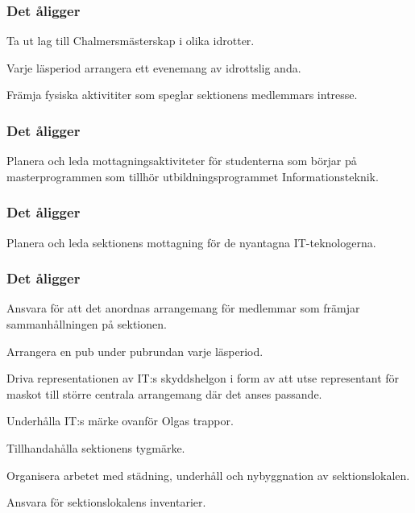 \subsubsection{Det åligger \FRITID}
\begin{att}
	\item Ta ut lag till Chalmersmästerskap i olika idrotter.
	\item Varje läsperiod arrangera ett evenemang av idrottslig anda.
	\item Främja fysiska aktivititer som speglar sektionens medlemmars intresse.
\end{att}

\subsubsection{Det åligger \MRCIT}
\begin{att}
  \item Planera och leda mottagningsaktiviteter för studenterna som börjar på masterprogrammen som tillhör utbildningsprogrammet Informationsteknik.
\end{att}

\subsubsection{Det åligger \NOLLKIT}
\begin{att}
	\item Planera och leda sektionens mottagning för de nyantagna IT-teknologerna.
\end{att}

\subsubsection{Det åligger \PRIT}
\begin{att}
	\item Ansvara för att det anordnas arrangemang för medlemmar som främjar sammanhållningen på sektionen.
	\item Arrangera en pub under pubrundan varje läsperiod.
	\item Driva representationen av IT:s skyddshelgon i form av att utse representant för maskot till större centrala arrangemang där det anses passande.
	\item Underhålla IT:s märke ovanför Olgas trappor.
	\item Tillhandahålla sektionens tygmärke.
	\item Organisera arbetet med städning, underhåll och nybyggnation av sektionslokalen.
	\item Ansvara för sektionslokalens inventarier.
\end{att}

